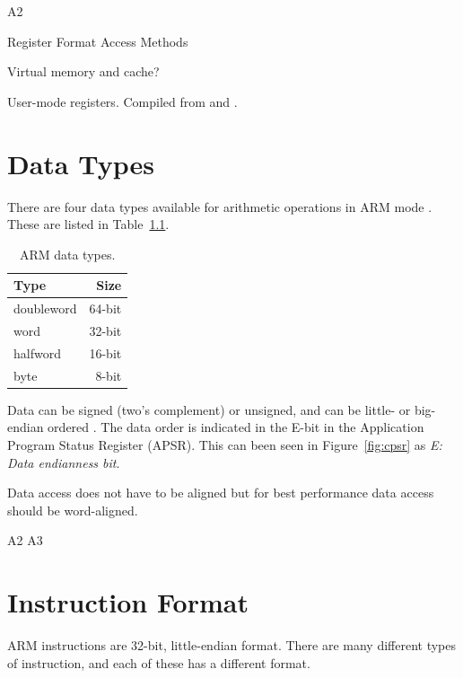\documentclass[oneside,a4paper]{report}
\begin{document}
A2

Register Format
Access Methods

Virtual memory and cache?


\begin{table}[p]
	\centering
	
	\caption{User-mode registers. Compiled from \cite[p. 15]{AAPCS} and \cite[p. 14--15]{iOSABI}.}
	\label{tab:registers}
\end{table}

\chapter{Data Types}

There are four data types available for arithmetic operations in ARM mode \cite[p. 2-14]{A8Ref}. These are listed in Table~\ref{tab:datatypes}.

\begin{table}[htb]
	\centering
	\begin{tabular}{lr}
		\toprule
		Type			&		Size		\\
		\midrule
		doubleword		&		64-bit		\\
		word			& 		32-bit		\\
		halfword 		& 		16-bit		\\
		byte 			& 		8-bit		\\
		\bottomrule
	\end{tabular}
	\caption{ARM data types.}
	\label{tab:datatypes}
\end{table}

Data can be signed (two's complement) or unsigned, and can be little- or big-endian ordered \cite[p. 4-2]{A8Ref}. The data order is indicated in the E-bit in the Application Program Status Register (APSR). This can been seen in Figure~\ref{fig:cpsr} as \emph{E: Data endianness bit}.

Data access does not have to be aligned but for best performance data access should be word-aligned.

A2
A3

\chapter{Instruction Format}

ARM instructions are 32-bit, little-endian format. There are many different types of instruction, and each of these has a different format. 
\end{document}
